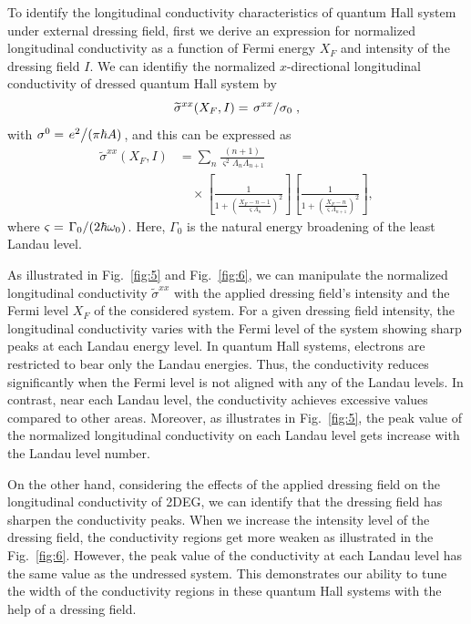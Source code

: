 
To identify the longitudinal conductivity characteristics of quantum Hall system under external dressing field, first we derive an expression for normalized longitudinal conductivity as a function of Fermi energy $X_F$ and intensity of the dressing field $I$.
We can identifiy the normalized $x$-directional longitudinal conductivity of dressed quantum Hall system by
\begin{equation}\label{eq:37}
  \widetilde{\sigma}^{xx}(X_F,I) =
  \flatfrac{\sigma^{xx}}{\sigma_{0}},
\end{equation}
with $\sigma^0 = \flatfrac{e^2}{(\pi \hbar A)}$, and this can be expressed as
\begin{equation} \label{eq:38}
  \begin{aligned}
    \widetilde{\sigma}^{xx}(X_F,I) &=
    \sum_{n}
    \frac{(n+1)}{\varsigma^2 \Lambda_n \Lambda_{n+1}} \\
    &\quad\times
    \left[
      \frac{1}
      {
        1 + \left(\frac{X_F - n -1}{\varsigma \Lambda_n}\right)^2
      }
    \right]
    \left[
      \frac{1}
      {
        1 + \left(\frac{X_F - n}{\varsigma \Lambda_{n+1}}\right)^2
      }
    \right],
  \end{aligned}
\end{equation}
where $\varsigma = \flatfrac{\Gamma_0}{(2\hbar \omega_0)}$. Here, $\Gamma_0$ is the natural energy broadening of the least Landau level.

As illustrated in Fig.~\ref{fig:5} and Fig.~\ref{fig:6}, we can manipulate the normalized longitudinal conductivity $\widetilde{\sigma}^{xx}$ with the applied dressing field's intensity and the Fermi level $X_F$ of the considered system.
For a given dressing field intensity, the longitudinal conductivity varies with  the Fermi level of the system showing sharp peaks at each Landau energy level.
In quantum Hall systems, electrons are restricted to bear only the Landau energies. Thus, the conductivity reduces significantly when the Fermi level is not aligned with any of the Landau levels. In contrast, near each Landau level, the conductivity achieves excessive values compared to other areas. Moreover, as illustrates in Fig.~\ref{fig:5}, the peak value of the normalized longitudinal conductivity on each Landau level gets increase with the Landau level number.

On the other hand, considering the effects of the applied dressing field on the longitudinal conductivity of 2DEG, we can identify that the dressing field has sharpen the conductivity peaks.
When we increase the intensity level of the dressing field, the conductivity regions get more weaken as illustrated in the Fig.~\ref{fig:6}.
However, the peak value of the conductivity at each Landau level has the same value as the undressed system. This demonstrates our ability to tune the width of the conductivity regions in these quantum Hall systems with the help of a dressing field.

